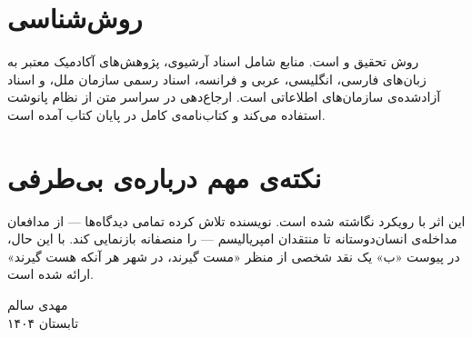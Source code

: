 \section*{روش‌شناسی}

روش تحقیق  و  است. منابع شامل اسناد آرشیوی، پژوهش‌های آکادمیک معتبر به زبان‌های فارسی، انگلیسی، عربی و فرانسه، اسناد رسمی سازمان ملل، و اسناد آزادشده‌ی سازمان‌های اطلاعاتی است. ارجاع‌دهی در سراسر متن از نظام پانوشت استفاده می‌کند و کتاب‌نامه‌ی کامل در پایان کتاب آمده است.

\section*{نکته‌ی مهم درباره‌ی بی‌طرفی}

این اثر با رویکرد  نگاشته شده است. نویسنده تلاش کرده تمامی دیدگاه‌ها — از مدافعان مداخله‌ی انسان‌دوستانه تا منتقدان امپریالیسم — را منصفانه بازنمایی کند. با این حال، در پیوست «ب» یک نقد شخصی از منظر «مست گیرند، در شهر هر آنکه هست گیرند» ارائه شده است.

\vspace{1cm}
\begin{flushleft}
  مهدی سالم\\
  تابستان ۱۴۰۴
\end{flushleft}

\cleardoublepage